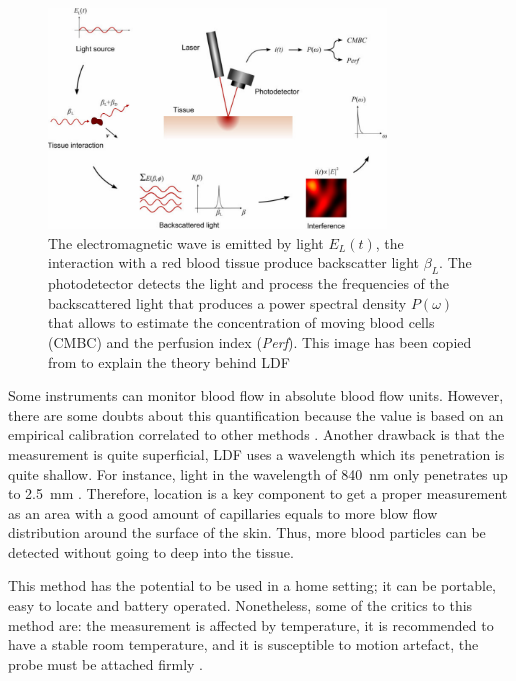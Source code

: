 \begin{figure}[!htpb]
	\centering
	\includegraphics[width=0.8\textwidth,keepaspectratio]{LDF}    
	\caption[Laser Doppler flowmetry theory overview]{The electromagnetic wave is emitted by light $E_L(t)$, the interaction with a red blood tissue produce backscatter light $\beta_L$. The photodetector detects the light and process the frequencies of the backscattered light that produces a power spectral density $P(\omega)$ that allows to estimate the concentration of moving blood cells (CMBC) and the perfusion index (\textit{Perf}). This image has been copied from \cite{fredriksson2007laser} to explain the theory behind LDF}
	\label{fig:LDF method}
\end{figure}

Some instruments can monitor blood flow in absolute blood flow units. However, there are some doubts about this quantification because the value is based on an empirical calibration correlated to other methods \cite{cooke1990laser}. Another drawback is that the measurement is quite superficial, LDF uses a wavelength which its penetration is quite shallow. For instance, light in the wavelength of \SI{840}{\nano \metre} only penetrates up to \SI{2.5}{\milli\metre} \cite{bashkatov2005optical}. Therefore, location is a key component to get a proper measurement as an area with a good amount of capillaries equals to more blow flow distribution around the surface of the skin. Thus, more blood particles can be detected without going to deep into the tissue. 

This method has the potential to be used in a home setting; it can be portable, easy to locate and battery operated. Nonetheless, some of the critics to this method are: the measurement is affected by temperature, it is recommended to have a stable room temperature, and it is susceptible to motion artefact, the probe must be attached firmly \cite{fredriksson2007laser}. 

